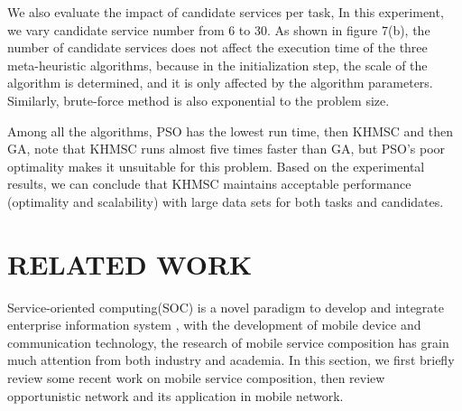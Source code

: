 \documentclass[10pt,journal,compsoc]{IEEEtran}
\begin{document}
We also evaluate the impact of candidate services per task, In this experiment, we vary candidate service number from 6 to 30. As shown in figure 7(b), the number of candidate services does not affect the execution time of the three meta-heuristic algorithms, because in the initialization step, the scale of the algorithm is determined, and it is only affected by the algorithm parameters. Similarly, brute-force method is also exponential to the problem size. 

Among all the algorithms, PSO has the lowest run time, then KHMSC and then GA, note that KHMSC runs almost five times faster than GA, but PSO's poor optimality makes it unsuitable for this problem. Based on the experimental results, we can conclude that KHMSC maintains acceptable performance (optimality and scalability) with large data sets for both tasks and candidates.

\section{RELATED WORK}
Service-oriented computing(SOC) is a novel paradigm to develop and integrate enterprise information system \cite{}, with the development of mobile device and communication technology, the research of mobile service composition has grain much attention from both industry and academia. In this section, we first briefly review some recent work on mobile service composition, then review opportunistic network and its application in mobile network.
\end{document}
